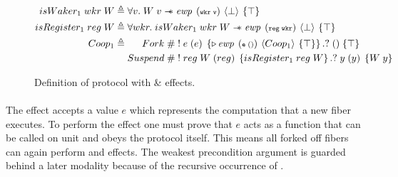 \begin{figure}[ht]
    \begin{align*}
        \gsIsWaker{1}\; wkr\; W & \triangleq \forall v.   \;  W\; v \wand{} \ewp{wkr\; v}{\bot}{\top}\label{spec:is_waker}                                                  \\
        \gsIsReg{1}\; reg\; W   & \triangleq \forall wkr. \; \gsIsWaker{1}\; wkr\; W \wand{} \ewp{reg\; wkr}{\bot}{\top}                                                    \\
        \proto{1}               & \triangleq \begin{aligned}[t]
                                                 Fork\;    & \# \; !\; e\; (e)\; \left\{\later \ewp{e\;()}{\proto{1}}{\top}\right\}. ?\; ()\; \{ \top \}           \\
                                                 Suspend\; & \# \; !\; reg\; W\; (reg)\; \left\{\gsIsReg{1}\; reg\; W\right\}.?\; y\; (y)\; \left\{ W\; y \right\}
                                             \end{aligned}
    \end{align*}
    \caption{Definition of  protocol with \efork{} \& \esuspend{} effects.}
    \label{fig:coop-protocol-1}\label{spec:suspend}
\end{figure}

\paragraph*{\efork{}}
The \efork{} effect accepts a value \(e\) which represents the computation that a new fiber executes.
To perform the effect one must prove that \(e\) acts as a function that can be called on unit and obeys the  protocol itself.
This means all forked off fibers can again perform \efork{} and \esuspend{} effects.
The weakest precondition argument is guarded behind a later modality because of the recursive occurrence of .

